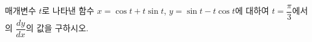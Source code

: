 매개변수 $t$로 나타낸 함수 $x=\cos t+t\sin t$, $y=\sin t-t\cos t$에 대하여 $t=\dfrac{\pi}{3}$에서의 $\dfrac{dy}{dx}$의 값을 구하시오.
